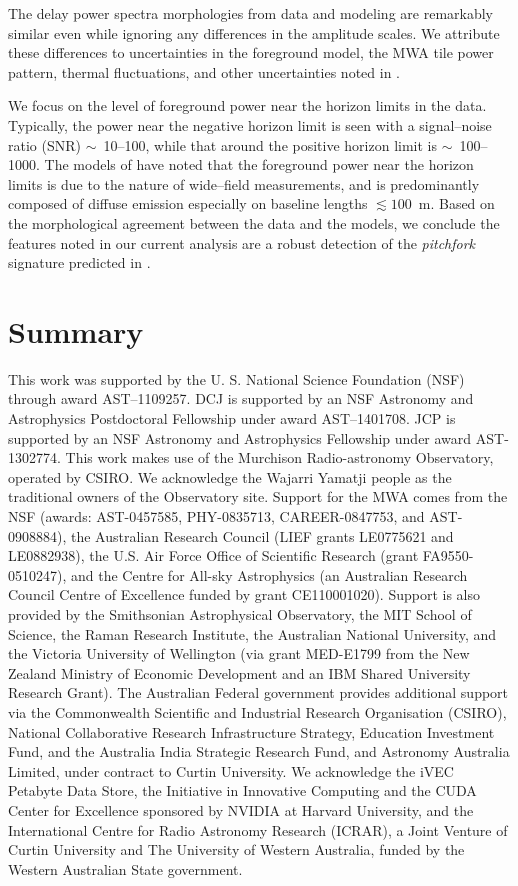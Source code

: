 \documentclass[preprint2,apjl,numberedappendix,twocolappendix,appendixfloats]{emulateapj}
\begin{document}
The delay power spectra morphologies from data and modeling are remarkably similar even while ignoring any differences in the amplitude scales. We attribute these differences to uncertainties in the foreground model, the MWA tile power pattern, thermal fluctuations, and other uncertainties noted in \citet{thy15}. 

We focus on the level of foreground power near the horizon limits in the data. Typically, the power near the negative horizon limit is seen with a signal--noise ratio (SNR) $\sim$~10--100, while that around the positive horizon limit is $\sim$~100--1000. The models of \citet{thy15} have noted that the foreground power near the horizon limits is due to the nature of wide--field measurements, and is predominantly composed of diffuse emission especially on baseline lengths $\lesssim 100$~m. Based on the morphological agreement between the data and the models, we conclude the features noted in our current analysis are a robust detection of the {\it pitchfork} signature predicted in \citet{thy15}.

\section{Summary}\label{sec:summary}

\acknowledgments

This work was supported by the U. S. National Science Foundation (NSF) through award AST--1109257. DCJ is supported by an NSF Astronomy and Astrophysics Postdoctoral Fellowship under award AST--1401708. JCP is supported by an NSF Astronomy and Astrophysics Fellowship under award AST-1302774. This work makes use of the Murchison Radio-astronomy Observatory, operated by CSIRO. We acknowledge the Wajarri Yamatji people as the traditional owners of the Observatory site. Support for the MWA comes from the NSF (awards: AST-0457585, PHY-0835713, CAREER-0847753, and AST-0908884), the Australian Research Council (LIEF grants LE0775621 and LE0882938), the U.S. Air Force Office of Scientific Research (grant FA9550-0510247), and the Centre for All-sky Astrophysics (an Australian Research Council Centre of Excellence funded by grant CE110001020). Support is also provided by the Smithsonian Astrophysical Observatory, the MIT School of Science, the Raman Research Institute, the Australian National University, and the Victoria University of Wellington (via grant MED-E1799 from the New Zealand Ministry of Economic Development and an IBM Shared University Research Grant). The Australian Federal government provides additional support via the Commonwealth Scientific and Industrial Research Organisation (CSIRO), National Collaborative Research Infrastructure Strategy, Education Investment Fund, and the Australia India Strategic Research Fund, and Astronomy Australia Limited, under contract to Curtin University. We acknowledge the iVEC Petabyte Data Store, the Initiative in Innovative Computing and the CUDA Center for Excellence sponsored by NVIDIA at Harvard University, and the International Centre for Radio Astronomy Research (ICRAR), a Joint Venture of Curtin University and The University of Western Australia, funded by the Western Australian State government.  



\end{document}
